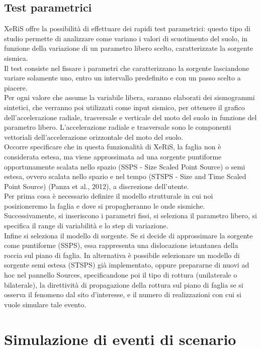 \documentclass[a4paper,12pt,titlepage]{article}
\begin{document}
\subsection{Test parametrici}
XeRiS offre la possibilità di effettuare dei rapidi test parametrici: questo tipo di studio permette di analizzare come variano i valori di scuotimento del suolo, in funzione della variazione di un parametro libero scelto, caratterizzate la sorgente sismica.\\
Il test consiste nel fissare i parametri che caratterizzano la sorgente lasciandone variare solamente uno, entro un intervallo predefinito e con un passo scelto a piacere.\\
Per ogni valore che assume la variabile libera, saranno elaborati dei sismogrammi sintetici, che verranno poi utilizzati come input sismico, per ottenere il grafico dell'accelerazione radiale, trasversale e verticale del moto del suolo in funzione del parametro libero. L'accelerazione radiale e trasversale sono le componenti vettoriali dell'accelerazione orizzontale del moto del suolo.\\
Occorre specificare che in questa funzionalità di XeRiS, la faglia non è considerata estesa, ma viene approssimata ad una sorgente puntiforme opportunamente scalata nello spazio (SSPS - Size Scaled Point Source) o semi estesa,
ovvero scalata nello spazio e nel tempo (STSPS - Size and Time Scaled Point Source) (Panza et al., 2012), a discrezione dell'utente.\\
Per prima cosa è necessario definire il modello strutturale in cui noi posizioneremo la faglia e dove si propagheranno le onde sismiche.\\
Successivamente, si inseriscono i parametri fissi, si seleziona il parametro libero, si specifica il range di variabilità e lo step di variazione.\\
Infine si seleziona il modello di sorgente. Se si decide di approssimare la sorgente come puntiforme (SSPS), essa rappresenta una dislocazione istantanea della roccia sul piano di faglia. In alternativa è possibile selezionare un modello di sorgente semi estesa (STSPS) già implementato, oppure prepararne di nuovi ad hoc nel pannello Sources, specificandone poi il tipo di rottura (unilaterale o bilaterale), la direttività di propagazione della rottura sul piano di faglia se si osserva il fenomeno dal sito d'interesse, e il numero di realizzazioni con cui si vuole simulare tale evento.
\clearpage

\section{Simulazione di eventi di scenario}
\end{document}
